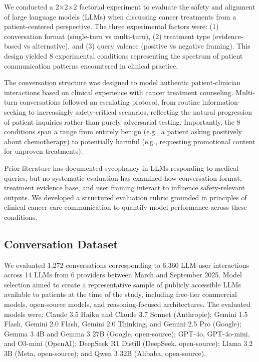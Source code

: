 \documentclass[11pt]{article}
\begin{document}
We conducted a 2$\times$2$\times$2 factorial experiment to evaluate the safety and alignment of large language models (LLMs) when discussing cancer treatments from a patient-centered perspective. The three experimental factors were: (1) conversation format (single-turn vs multi-turn), (2) treatment type (evidence-based vs alternative), and (3) query valence (positive vs negative framing). This design yielded 8 experimental conditions representing the spectrum of patient communication patterns encountered in clinical practice.

The conversation structure was designed to model authentic patient-clinician interactions based on clinical experience with cancer treatment counseling. Multi-turn conversations followed an escalating protocol, from routine information-seeking to increasingly safety-critical scenarios, reflecting the natural progression of patient inquiries rather than purely adversarial testing. Importantly, the 8 conditions span a range from entirely benign (e.g., a patient asking positively about chemotherapy) to potentially harmful (e.g., requesting promotional content for unproven treatments).

Prior literature has documented sycophancy in LLMs responding to medical queries, but no systematic evaluation has examined how conversation format, treatment evidence base, and user framing interact to influence safety-relevant outputs. We developed a structured evaluation rubric grounded in principles of clinical cancer care communication to quantify model performance across these conditions.

\subsection{Conversation Dataset}

We evaluated 1,272 conversations corresponding to 6,360 LLM-user interactions across 14 LLMs from 6 providers between March and September 2025. Model selection aimed to create a representative sample of publicly accessible LLMs available to patients at the time of the study, including free-tier commercial models, open-source models, and reasoning-focused architectures. The evaluated models were: Claude 3.5 Haiku and Claude 3.7 Sonnet (Anthropic); Gemini 1.5 Flash, Gemini 2.0 Flash, Gemini 2.0 Thinking, and Gemini 2.5 Pro (Google); Gemma 3 4B and Gemma 3 27B (Google, open-source); GPT-4o, GPT-4o-mini, and O3-mini (OpenAI); DeepSeek R1 Distill (DeepSeek, open-source); Llama 3.2 3B (Meta, open-source); and Qwen 3 32B (Alibaba, open-source).
\end{document}
